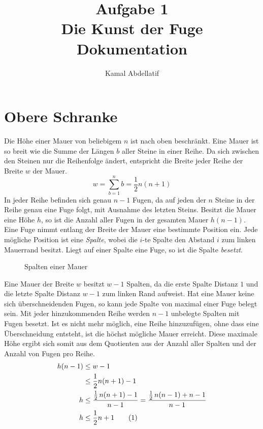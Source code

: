 \documentclass[a4paper, 12pt]{scrartcl}
\title{Aufgabe 1\\Die Kunst der Fuge\\Dokumentation}
\author{Kamal Abdellatif}
\date{}
\newcommand{\numberthis}{\addtocounter{equation}{1}\tag{\theequation}}
\begin{document}
\maketitle
\section{Obere Schranke}
Die Höhe einer Mauer von beliebigem $n$ ist nach oben beschränkt. Eine Mauer ist so breit wie die Summe der Längen $b$ aller Steine in einer Reihe. Da sich zwischen den Steinen nur die Reihenfolge ändert, entspricht die Breite jeder Reihe der Breite $w$ der Mauer.
\begin{equation}\label{eq:width}
	w = \sum_{b = 1}^n b = \frac{1}{2}n(n+1)
\end{equation}
In jeder Reihe befinden sich genau $n-1$ Fugen, da auf jeden der $n$ Steine in der Reihe genau eine Fuge folgt, mit Ausnahme des letzten Steins. Besitzt die Mauer eine Höhe $h$, so ist die Anzahl aller Fugen in der gesamten Mauer $h(n-1)$.\\
Eine Fuge nimmt entlang der Breite der Mauer eine bestimmte Position ein. Jede mögliche Position ist eine \emph{Spalte}, wobei die $i$-te Spalte den Abstand $i$ zum linken Mauerrand besitzt. Liegt auf einer Spalte eine Fuge, so ist die Spalte \emph{besetzt}.
\begin{figure}[H]
	\centering
	\caption{Spalten einer Mauer}
\end{figure}
Eine Mauer der Breite $w$ besitzt $w-1$ Spalten, da die erste Spalte Distanz $1$ und die letzte Spalte Distanz $w-1$ zum linken Rand aufweist.
Hat eine Mauer keine sich überschneidenden Fugen, so kann jede Spalte von maximal einer Fuge belegt sein. Mit jeder hinzukommenden Reihe werden $n-1$ unbelegte Spalten mit Fugen besetzt. Ist es nicht mehr möglich, eine Reihe hinzuzufügen, ohne dass eine Überschneidung entsteht, ist die höchst mögliche Mauer erreicht. Diese maximale Höhe ergibt sich somit aus dem Quotienten aus der Anzahl aller Spalten und der Anzahl von Fugen pro Reihe.
\begin{align*}
	h(n-1) &\le w-1 \\
	&\le \frac{1}{2}n(n+1) -1 \\
	h &\le \frac{\frac{1}{2}\,n(n+1)-1}{n-1} = \frac{\frac{1}{2}\,n(n-1)+n-1}{n-1} \\
	h &\le \frac{1}{2}n + 1 \numberthis\label{eq:schranke}
\end{align*}
\end{document}
